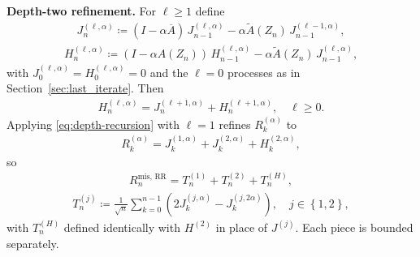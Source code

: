 \textbf{Depth-two refinement.} For \(\ell \ge 1\) define
\begin{equation}
\begin{aligned}
J_n^{(\ell, \alpha)} \coloneqq (I - \alpha \overline{A}) \, J_{n - 1}^{(\ell, \alpha)}
                       - \alpha \widetilde{A}(Z_n) \, J_{n - 1}^{(\ell - 1, \alpha)},
\end{aligned}
\end{equation}
\begin{equation}
\begin{aligned}
H_n^{(\ell, \alpha)} \coloneqq (I - \alpha A(Z_n)) \, H_{n - 1}^{(\ell, \alpha)}
                       - \alpha \widetilde{A}(Z_n) \, J_{n - 1}^{(\ell, \alpha)},
\end{aligned}
\end{equation}
with \(J_0^{(\ell, \alpha)} = H_0^{(\ell, \alpha)} = 0\) and the \(\ell = 0\)
processes as in Section~\ref{sec:last_iterate}. Then
\begin{equation}
\begin{aligned}
H_n^{(\ell, \alpha)} = J_n^{(\ell + 1, \alpha)} + H_n^{(\ell + 1, \alpha)},
\quad \ell \ge 0.
\end{aligned}
\label{eq:depth-recursion}
\end{equation}
Applying \eqref{eq:depth-recursion} with \(\ell = 1\) refines \(R_k^{(\alpha)}\) to
\begin{equation}
\begin{aligned}
R_k^{(\alpha)} = J_k^{(1, \alpha)} + J_k^{(2, \alpha)} + H_k^{(2, \alpha)},
\end{aligned}
\end{equation}
so
\begin{equation}
\begin{aligned}
R_n^{\text{mis, RR}} = T_n^{(1)} + T_n^{(2)} + T_n^{(H)},
\end{aligned}
\label{eq:R-mis-split}
\end{equation}
\begin{equation}
\begin{aligned}
T_n^{(j)} \coloneqq \frac{1}{\sqrt{n}} \sum_{k = 0}^{n - 1}
              \left(2 J_k^{(j, \alpha)} - J_k^{(j, 2 \alpha)}\right),
\quad j \in \left\{1, 2\right\},
\end{aligned}
\end{equation}
with \(T_n^{(H)}\) defined identically with \(H^{(2)}\) in place of \(J^{(j)}\).
Each piece is bounded separately.

